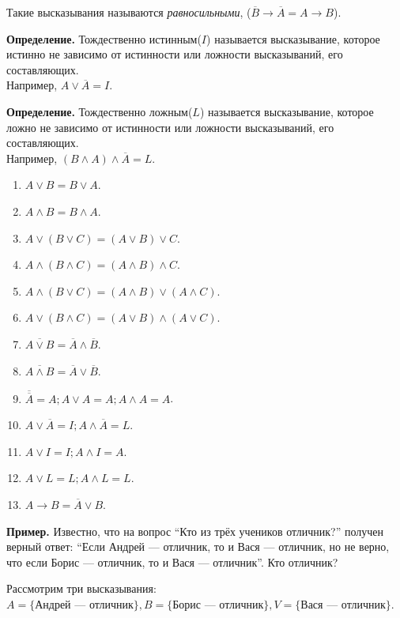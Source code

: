 \documentclass{article}
\begin{document}
    Такие высказывания называются \textit{равносильными}, (\(\overline{B} \rightarrow \overline{A} = A \rightarrow B\)).

    \textbf{Определение.} Тождественно истинным(\(I\)) называется высказывание, которое истинно не зависимо от истинности или ложности высказываний, его составляющих.\\
    Например, \(A \vee \overline{A} = I\).

    \textbf{Определение.} Тождественно ложным(\(L\)) называется высказывание, которое ложно не зависимо от истинности или ложности высказываний, его составляющих.\\
    Например, \((B \wedge A) \wedge \overline{A} = L\).

    \begin{enumerate}
        \item \(A \vee B = B \vee A\).
        \item \(A \wedge B = B \wedge A\).
        \item \(A \vee (B \vee C) = (A \vee B) \vee C\).
        \item \(A \wedge (B \wedge C) = (A \wedge B) \wedge C\).
        \item \(A \wedge (B \vee C) = (A \wedge B) \vee (A \wedge C)\).
        \item \(A \vee (B \wedge C) = (A \vee B) \wedge (A \vee C)\).
        \item \(\overline{A \vee B} = \overline{A} \wedge \overline{B}\).
        \item \(\overline{A \wedge B} = \overline{A} \vee \overline{B}\).
        \item \(\overline{\overline A} = A; A \vee A = A; A \wedge A = A\).
        \item \(A \vee \overline{A} = I; A \wedge \overline{A} = L\).
        \item \(A \vee I = I; A \wedge I = A\).
        \item \(A \vee L = L; A \wedge L = L\).
        \item \(A \rightarrow B = \overline{A} \vee B\).
    \end{enumerate}

    \textbf{Пример.} Известно, что на вопрос ``Кто из трёх учеников отличник?'' получен верный ответ: ``Если Андрей --- отличник, то и Вася --- отличник, но не верно, что если Борис --- отличник, то и Вася --- отличник''. Кто отличник?

    Рассмотрим три высказывания: \(A=\{\textrm{Андрей --- отличник}\}, B=\{\textrm{Борис --- отличник}\}, V=\{\textrm{Вася --- отличник}\}\).
\end{document}
